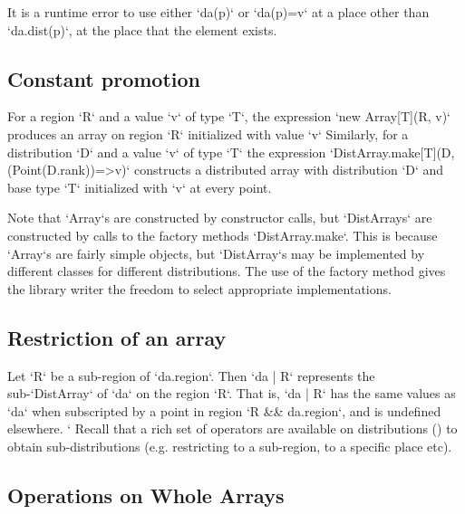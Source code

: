 It is a runtime error to use either \xcd`da(p)` or \xcd`da(p)=v` at a place
other than \xcd`da.dist(p)`, \viz{} at the place that the element exists. 


\subsection{Constant promotion}\label{ConstantArray}

For a region \xcd`R` and a value \xcd`v` of type \xcd`T`, the expression 
\xcd`new Array[T](R, v)` 
produces an array on region \xcd`R` initialized with value \xcd`v`
Similarly, 
for a distribution \xcd`D` and a value \xcd`v` of
type \xcd`T` the expression 
\xcd`DistArray.make[T](D, (Point(D.rank))=>v)`
constructs a distributed array with
distribution \xcd`D` and base type \xcd`T` initialized with \xcd`v`
at every point.

Note that \xcd`Array`s are constructed by constructor calls, but
\xcd`DistArrays` are constructed by calls to the factory methods
\xcd`DistArray.make`. This is because \xcd`Array`s are fairly simple objects,
but \xcd`DistArray`s may be implemented by different classes for different
distributions. The use of the factory method gives the library writer the
freedom to select appropriate implementations.


\subsection{Restriction of an array}

Let \xcd`R` be a sub-region of \xcd`da.region`. Then 
\xcd`da | R`
represents the sub-\xcd`DistArray` of \xcd`da` on the region \xcd`R`.
That is, \xcd`da | R` has the same values as \xcd`da` when subscripted by a
point in region \xcd`R && da.region`, and is undefined elsewhere.
`
Recall that a rich set of operators are available on distributions
() to obtain sub-distributions
(e.g. restricting to a sub-region, to a specific place etc).


\subsection{Operations on Whole Arrays}


